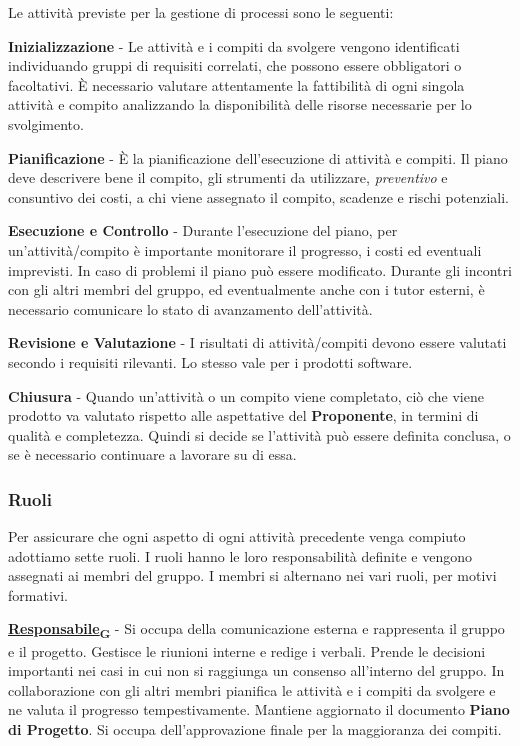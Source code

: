 \documentclass[12pt, a4paper]{article}
\newcommand{\urlglossario}{https://skynetunigroup.github.io/Code_Guardian/Documentazione/RTB/glossario_v1.0.0.pdf} %
\newcommand{\glo}[2]{\href{\urlglossario\#nameddest=#2}{#1\textsubscript{G}}}
\begin{document}
Le attività previste per la gestione di processi sono le seguenti:

\textbf{Inizializzazione} - Le attività e i compiti da svolgere vengono identificati individuando gruppi di requisiti correlati, che possono essere obbligatori o facoltativi. È necessario valutare attentamente la fattibilità di ogni singola attività e compito analizzando la disponibilità delle risorse necessarie per lo svolgimento.

 \textbf{Pianificazione} - È la pianificazione dell'esecuzione di attività e compiti. Il piano deve descrivere bene il compito, gli strumenti da utilizzare, \textit{preventivo} e consuntivo dei costi, a chi viene assegnato il compito, scadenze e rischi potenziali.
 
 \textbf{Esecuzione e Controllo} - Durante l'esecuzione del piano, per un'attività/compito è importante monitorare il progresso, i costi ed eventuali imprevisti. In caso di problemi il piano può essere modificato. Durante gli incontri con gli altri membri del gruppo, ed eventualmente anche con i tutor esterni, è necessario comunicare lo stato di avanzamento dell'attività.
 
 \textbf{Revisione e Valutazione} - I risultati di attività/compiti devono essere valutati secondo i requisiti rilevanti. Lo stesso vale per i prodotti software.
 
 \textbf{Chiusura} - Quando un'attività o un compito viene completato, ciò che viene prodotto va valutato rispetto alle aspettative del \textbf{Proponente}, in termini di qualità e completezza. Quindi si decide se l'attività può essere definita conclusa, o se è necessario continuare a lavorare su di essa.

\subsubsection{Ruoli}

Per assicurare che ogni aspetto di ogni attività precedente venga compiuto adottiamo sette ruoli. I ruoli hanno le loro responsabilità definite e vengono assegnati ai membri del gruppo. I membri si alternano nei vari ruoli, per motivi formativi.

\textbf{\glo{Responsabile}{responsabile}} - Si occupa della comunicazione esterna e rappresenta il gruppo e il progetto. Gestisce le riunioni interne e redige i verbali. Prende le decisioni importanti nei casi in cui non si raggiunga un consenso all'interno del gruppo. In collaborazione con gli altri membri pianifica le attività e i compiti da svolgere e ne valuta il progresso tempestivamente. Mantiene aggiornato il documento \textbf{Piano di Progetto}. Si occupa dell'approvazione finale per la maggioranza dei compiti.
\end{document}
